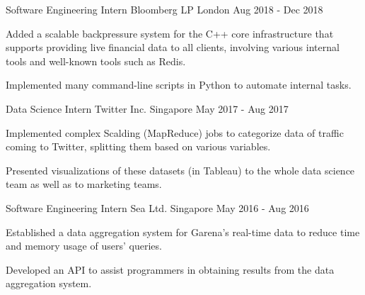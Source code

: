 \begin{cventries}
  \cventry
  {Software Engineering Intern} %
  {Bloomberg LP} %
  {London} %
  {Aug 2018 - Dec 2018} %
  {
    \begin{cvitems} %
    \item {Added a scalable backpressure system for the C++ core infrastructure that supports providing live financial data to all clients, involving various internal tools and well-known tools such as Redis.}
    \item {Implemented many command-line scripts in Python to automate internal tasks.}
    \end{cvitems}
  }

  \cventry
  {Data Science Intern} %
  {Twitter Inc.} %
  {Singapore} %
  {May 2017 - Aug 2017} %
  {
    \begin{cvitems} %
    \item {Implemented complex Scalding (MapReduce) jobs to categorize data of traffic coming to Twitter, splitting them based on various variables.}
    \item {Presented visualizations of these datasets (in Tableau) to the whole data science team as well as to marketing teams.}
    \end{cvitems}
  }

  \cventry
  {Software Engineering Intern} %
  {Sea Ltd.} %
  {Singapore} %
  {May 2016 - Aug 2016} %
  {
    \begin{cvitems} %
    \item {Established a data aggregation system for Garena's real-time data to reduce time and memory usage of users' queries.}
    \item {Developed an API to assist programmers in obtaining results from the data aggregation system.}
    \end{cvitems}
  }

\end{cventries}
